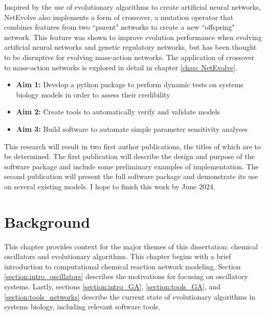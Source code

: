 \documentclass[12pt]{report}
\begin{document}
Inspired by the use of evolutionary algorithms to create artificial neural networks, NetEvolve also implements a form of crossover, a mutation operator that combines features from two ``parent" networks to create a new ``offspring" network. This feature was shown to improve evolution performance when evolving artificial neural networks and genetic regulatory networks, but has been thought to be disruptive for evolving mass-action networks. The application of crossover to mass-action networks is explored in detail in chapter \ref{chap: NetEvolve}.

\begin{itemize}
\item\textbf{Aim 1:} Develop a python package to perform dynamic tests on systems biology models in order to assess their credibility
\item\textbf{Aim 2:} Create tools to automatically verify and validate models
\item\textbf{Aim 3:} Build software to automate simple parameter sensitivity analyses
\end{itemize}

This research will result in two first author publications, the titles of which are to be determined. The first publication will describe the design and purpose of the software package and include some preliminary examples of implementation. The second publication will present the full software package and demonstrate its use on several existing models. I hope to finish this work by June 2024.

\chapter{Background}

This chapter provides context for the major themes of this dissertation: chemical oscillators and evolutionary algorithms. This chapter begins with a brief introduction to computational chemical reaction network modeling. Section \ref{section:intro_oscillators} describes the motivations for focusing on oscillatory systems. Lastly, sections \ref{section:intro_GA}, \ref{section:tools_GA}, and \ref{section:tools_networks} describe the current state of evolutionary algorithms in systems biology, including relevant software tools.
\end{document}
